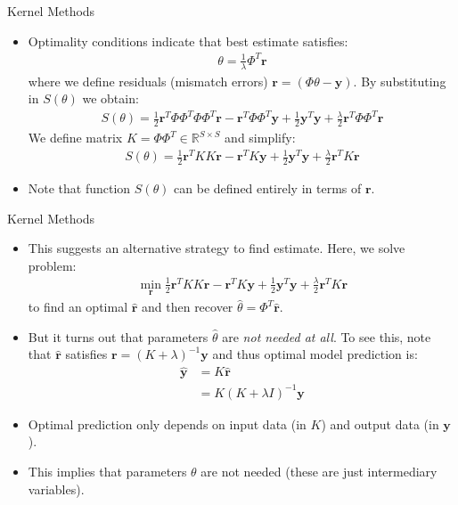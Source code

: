 \documentclass[9pt]{beamer}
\begin{document}

\begin{frame}{Kernel Methods}
\begin{itemize}
\item Optimality conditions indicate that best estimate satisfies:
\begin{align*}
\theta=\frac{1}{\lambda}\Phi^T\mathbf{r}
\end{align*}
where we define residuals (mismatch errors) $\mathbf{r}=(\Phi\theta-\mathbf{y})$.  By substituting in $S(\theta)$ we obtain:
\begin{align*}
S(\theta)= \frac{1}{2}\mathbf{r}^T\Phi\Phi^T\Phi\Phi^T\mathbf{r}-\mathbf{r}^T\Phi\Phi^T\mathbf{y}+\frac{1}{2}\mathbf{y}^T\mathbf{y}+\frac{\lambda}{2}\mathbf{r}^T\Phi\Phi^T\mathbf{r}
\end{align*}
We define matrix $K=\Phi\Phi^T\in \mathbb{R}^{S\times S}$ and simplify:
\begin{align*}
S(\theta)= \frac{1}{2}\mathbf{r}^TKK\mathbf{r}-\mathbf{r}^TK\mathbf{y}+\frac{1}{2}\mathbf{y}^T\mathbf{y}+\frac{\lambda}{2}\mathbf{r}^TK\mathbf{r}
\end{align*}
\item Note that function $S(\theta)$ can be defined entirely in terms of $\mathbf{r}$. 

\end{itemize}

\end{frame}


\begin{frame}{Kernel Methods}
\begin{itemize}
\item This suggests an alternative strategy to find estimate. Here, we solve problem: 
\begin{align*}
\min_{\mathbf{r}} \frac{1}{2}\mathbf{r}^TKK\mathbf{r}-\mathbf{r}^TK\mathbf{y}+\frac{1}{2}\mathbf{y}^T\mathbf{y}+\frac{\lambda}{2}\mathbf{r}^TK\mathbf{r}
\end{align*}
to find an optimal $\hat{\mathbf{r}}$ and then recover $\hat{\theta}=\Phi^T\hat{\mathbf{r}}$. 
\item But it turns out that parameters $\hat{\theta}$ are {\em not needed at all}. To see this, note that $\hat{\mathbf{r}}$ satisfies $\mathbf{r}=(K+\lambda)^{-1}\mathbf{y}$ and thus optimal model prediction is:
\begin{align*}
\hat{\mathbf{y}}&=K\hat{\mathbf{r}}\\
&= K(K+\lambda I)^{-1}\mathbf{y}
\end{align*}
\item Optimal prediction only depends on input data (in $K$) and output data (in $\mathbf{y}$).  

\item This implies that parameters $\theta$ are not needed (these are just intermediary variables). 

\end{itemize}

\end{frame}
\end{document}
